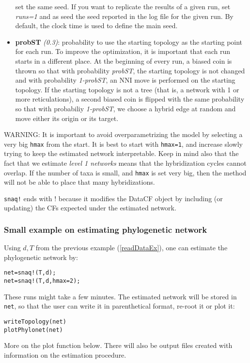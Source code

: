 \documentclass[12pt]{article}
\begin{document}
\begin{itemize}
  set the same seed. If you want to replicate the results of a given
  run, set \textit{runs=1} and as seed the seed reported in the log
  file for the given run. By default, the clock time is used to
  define the main seed.
\item \textbf{probST} \textit{(0.3)}: probability to use the starting
  topology as the starting point for each run. To improve the
  optimization, it is important that each run starts in a different
  place. At the beginning of every run, a biased coin is thrown so
  that with probability \textit{probST}, the starting topology is not
  changed and with probability \textit{1-probST}, an NNI move is
  performed on the starting topology. If the starting topology is not
  a tree (that is, a network with 1 or more reticulations), a second
  biased coin is flipped with the same probability so that with
  probabiliy \textit{1-probST}, we choose a hybrid edge at random and
  move either its origin or its target.
\end{itemize}

WARNING: It is important to avoid overparametrizing the model
by selecting a very big \texttt{hmax} from the start. It is best to start
with \texttt{hmax=1}, and increase slowly trying to keep the
estimated network interpretable. Keep in mind also that the fact that
we estimate \textit{level 1 networks} means that the hybridization
cycles cannot overlap. If the number of taxa is small, and
\texttt{hmax} is set very big, then the method will not be able to
place that many hybridizations.

\texttt{snaq!} ends with ! because it modifies the DataCF object by
including (or updating) the CFs expected under the estimated network.

\subsubsection{Small example on estimating phylogenetic network}
Using $d,T$ from the previous example (\ref{readDataEx}), one can
estimate the phylogenetic network by:
\begin{lstlisting}
net=snaq!(T,d);
net=snaq!(T,d,hmax=2);
\end{lstlisting}
These runs might take a few minutes. The estimated network will be
stored in \texttt{net}, so that the user can write it in parenthetical
format, re-root it or plot it:
\begin{lstlisting}
writeTopology(net)
plotPhylonet(net)
\end{lstlisting}
More on the plot function below. There will also be output files
created with information on the estimation procedure.
\end{document}
